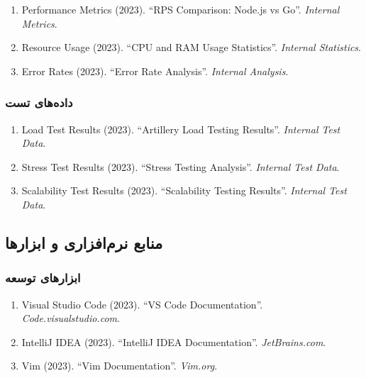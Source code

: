 \documentclass[
]{article}
\begin{document}
\begin{enumerate}
\def\labelenumi{\arabic{enumi}.}
\setcounter{enumi}{78}
\item
  Performance Metrics (2023). ``RPS Comparison: Node.js vs Go''.
  \emph{Internal Metrics}.
\item
  Resource Usage (2023). ``CPU and RAM Usage Statistics''.
  \emph{Internal Statistics}.
\item
  Error Rates (2023). ``Error Rate Analysis''. \emph{Internal Analysis}.
\end{enumerate}

\subsubsection{داده‌های
تست}\label{ux62fux627ux62fux647ux647ux627ux6cc-ux62aux633ux62a}

\begin{enumerate}
\def\labelenumi{\arabic{enumi}.}
\setcounter{enumi}{81}
\item
  Load Test Results (2023). ``Artillery Load Testing Results''.
  \emph{Internal Test Data}.
\item
  Stress Test Results (2023). ``Stress Testing Analysis''.
  \emph{Internal Test Data}.
\item
  Scalability Test Results (2023). ``Scalability Testing Results''.
  \emph{Internal Test Data}.
\end{enumerate}

\subsection{منابع نرم‌افزاری و
ابزارها}\label{ux645ux646ux627ux628ux639-ux646ux631ux645ux627ux641ux632ux627ux631ux6cc-ux648-ux627ux628ux632ux627ux631ux647ux627}

\subsubsection{ابزارهای
توسعه}\label{ux627ux628ux632ux627ux631ux647ux627ux6cc-ux62aux648ux633ux639ux647-1}

\begin{enumerate}
\def\labelenumi{\arabic{enumi}.}
\setcounter{enumi}{84}
\item
  Visual Studio Code (2023). ``VS Code Documentation''.
  \emph{Code.visualstudio.com}.
\item
  IntelliJ IDEA (2023). ``IntelliJ IDEA Documentation''.
  \emph{JetBrains.com}.
\item
  Vim (2023). ``Vim Documentation''. \emph{Vim.org}.
\end{enumerate}
\end{document}
